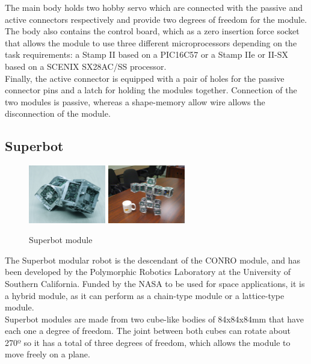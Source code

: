 The main body holds two hobby servo which are connected with the passive and active connectors respectively and provide two degrees of freedom for the module. The body also contains the control board, which as a zero insertion force socket that allows the module to use three different microprocessors depending on the task requirements: a Stamp II based on a PIC16C57 or a Stamp IIe or II-SX based on a SCENIX SX28AC/SS processor.
\\

Finally, the active connector is equipped with a pair of holes for the passive connector pins and a latch for holding the modules together. Connection of the two modules is passive, whereas a shape-memory allow wire allows the disconnection of the module.


\subsection{Superbot}
\label{state_modules_Superbot}

\begin{figure}[h]
	\centering
	\includegraphics[width=0.3\textwidth]{images/Superbot01.JPG}
	\includegraphics[width=0.3\textwidth]{images/Superbot02.JPG}
	\caption{Superbot module}\label{fig:superbot}
\end{figure}


The Superbot\cite{salemi_superbot:_2006} modular robot is the descendant of the CONRO module, and has been developed by the Polymorphic Robotics Laboratory at the University of Southern California. Funded by the NASA to be used for space applications, it is a hybrid module, as it can perform as a chain-type module or a lattice-type module.
\\

Superbot modules are made from two cube-like bodies of 84x84x84mm that have each one a degree of freedom. The joint between both cubes can rotate about 270º so it has a total of three degrees of freedom, which allows the module to move freely on a plane.
\\

